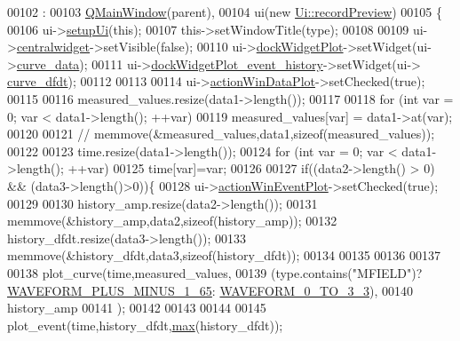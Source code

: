 \begin{DoxyCode}
00102                                                                                                            
                             :
00103     \hyperlink{a00058}{QMainWindow}(parent),
00104     ui(\textcolor{keyword}{new} \hyperlink{a00074}{Ui::recordPreview})
00105 \{
00106     ui->\hyperlink{a00081_afa41dc070a896a5eae476f3c0206825c}{setupUi}(\textcolor{keyword}{this});
00107     this->setWindowTitle(type);
00108 
00109     ui->\hyperlink{a00081_ac9ab4609922159e8e4cc45905f76928e}{centralwidget}->setVisible(\textcolor{keyword}{false});
00110     ui->\hyperlink{a00081_a07b76f17803ec09e0367b72938bbd097}{dockWidgetPlot}->setWidget(ui->\hyperlink{a00081_a247d94481323c0bc4f8b6458a8a535dd}{curve\_data});
00111     ui->\hyperlink{a00081_a2a8f7ee8d4458dd20481c8a1c29ce185}{dockWidgetPlot\_event\_history}->setWidget(ui->
      \hyperlink{a00081_a43d24fa14d90cc27b310542e39dcdd1b}{curve\_dfdt});
00112 
00113 
00114     ui->\hyperlink{a00081_aa09067a9c96c9cd78f75261a9fcb89f0}{actionWinDataPlot}->setChecked(\textcolor{keyword}{true});
00115 
00116     measured\_values.resize(data1->length());
00117 
00118     \textcolor{keywordflow}{for} (\textcolor{keywordtype}{int} var = 0; var < data1->length(); ++var)
00119       measured\_values[var] = data1->at(var);
00120 
00121    \textcolor{comment}{// memmove(&measured\_values,data1,sizeof(measured\_values));}
00122 
00123     time.resize(data1->length());
00124     \textcolor{keywordflow}{for} (\textcolor{keywordtype}{int} var = 0; var < data1->length(); ++var)
00125         time[var]=var;
00126 
00127     \textcolor{keywordflow}{if}((data2->length() > 0) && (data3->length()>0))\{
00128         ui->\hyperlink{a00081_ac72ec9c8679d46fd43a87f99ee6db893}{actionWinEventPlot}->setChecked(\textcolor{keyword}{true});
00129 
00130         history\_amp.resize(data2->length());
00131         memmove(&history\_amp,data2,\textcolor{keyword}{sizeof}(history\_amp));
00132         history\_dfdt.resize(data3->length());
00133         memmove(&history\_dfdt,data3,\textcolor{keyword}{sizeof}(history\_dfdt));
00134 
00135 
00136 
00137 
00138         plot\_curve(time,measured\_values,
00139                   (type.contains(\textcolor{stringliteral}{"MFIELD"})?\hyperlink{a00090_a0923d3b365a36e1e8c401cec964aa36f}{WAVEFORM\_PLUS\_MINUS\_1\_65}:
      \hyperlink{a00090_ae18fed2471b16a8516d721ff60671dd9}{WAVEFORM\_0\_TO\_3\_3}),
00140                   history\_amp
00141                   );
00142 
00143 
00144 
00145         plot\_event(time,history\_dfdt,\hyperlink{a00073_ad38222699419e6ac871ce2a23c6d292e}{max}(history\_dfdt));

\end{DoxyCode}
